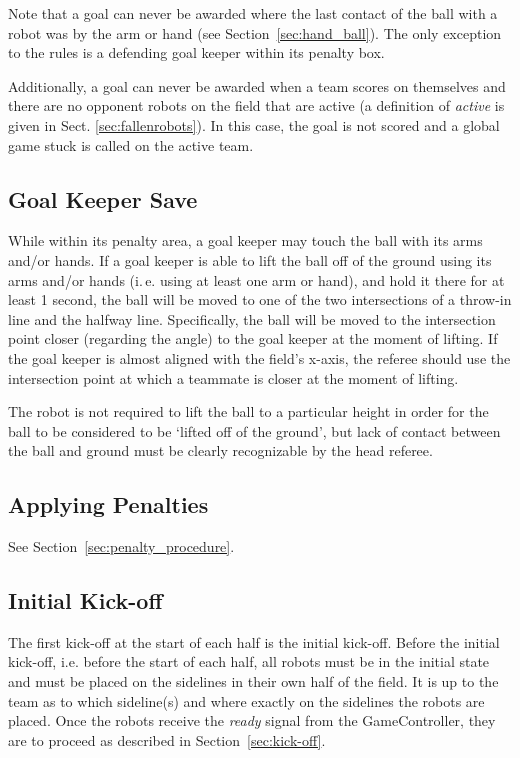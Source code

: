 \documentclass[12pt]{article}
\newcommand{\ie}{\mbox{i.\,e.}\xspace}
\begin{document}
Note that a goal can never be awarded where the last contact of the ball with a robot was by the arm or hand (see Section~\ref{sec:hand_ball}).  The only exception to the rules is a defending goal keeper within its penalty box.

Additionally, a goal can never be awarded when a team scores on themselves and there are no opponent robots on the field that are active (a definition of \emph{active} is given in Sect. \ref{sec:fallenrobots}).  In this case, the goal is not scored and a global game stuck is called on the active team.

\subsection{Goal Keeper Save}
\label{sec:goalie_save}
While within its penalty area, a goal keeper may touch the ball with its arms and/or hands.  If a goal keeper is able to lift the ball off of the ground using its arms and/or hands (\ie using at least one arm or hand), and hold it there for at least 1 second, the ball will be moved to one of the two intersections of a throw-in line and the halfway line. Specifically, the ball will be moved to the intersection point closer (regarding the angle) to the goal keeper at the moment of lifting. If the goal keeper is almost aligned with the field's x-axis, the referee should use the intersection point at which a teammate is closer at the moment of lifting.

The robot is not required to lift the ball to a particular height in order for the ball to be considered to be `lifted off of the ground', but lack of contact between the ball and ground must be clearly recognizable by the head referee.

\subsection{Applying Penalties}

See Section~\ref{sec:penalty_procedure}.


\subsection{Initial Kick-off}
\label{sec:initial-kick-off}

The first kick-off at the start of each half is the initial kick-off.
Before the initial kick-off, i.e. before the start of each half, all robots must be in the initial state and must be placed on the sidelines in their own half of the field.
It is up to the team as to which sideline(s) and where exactly on the sidelines the robots are placed.
Once the robots receive the \emph{ready} signal from the GameController, they are to proceed as described in Section~\ref{sec:kick-off}.
\end{document}
